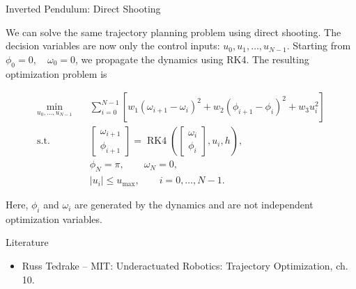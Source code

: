 \documentclass{beamer}
\begin{document}
\begin{frame}{Inverted Pendulum: Direct Shooting}
	\begin{flushleft}
		We can solve the same trajectory planning problem using
		direct shooting. The decision variables are now only the control inputs: $		u_0,u_1,\ldots,u_{N-1}$. Starting from $		\phi_0=0,
		\quad
		\omega_0=0$, 
		we propagate the dynamics using RK4. The resulting optimization problem is

		\begin{align}
			\min_{u_0,\ldots,u_{N-1}}\quad
			&
			\sum_{i=0}^{N-1}
			\left[
			w_1(\omega_{i+1}-\omega_i)^2
			+
			w_2(\phi_{i+1}-\phi_i)^2
			+
			w_3u_i^2
			\right]
			\\[0.5em]
			\text{s.t.}\quad
			&
			\begin{bmatrix}
				\omega_{i+1}\\
				\phi_{i+1}
			\end{bmatrix}
			=
			\operatorname{RK4}
			\left(
			\begin{bmatrix}
			\omega_i\\
			\phi_i
		\end{bmatrix},
		u_i,h
		\right),
		\\
		&
		\phi_N=\pi,\qquad
		\omega_N=0,
		\\
		&
		|u_i|\leq u_{\max},
		\qquad i=0,\ldots,N-1.
	\end{align}

	
	Here, $\phi_i$ and $\omega_i$ are generated by the
	dynamics and are not independent optimization variables.
\end{flushleft}
\end{frame}



\begin{frame}{Literature}
	
	\begin{itemize}
		
		
		\item Russ Tedrake -- MIT:
		{Underactuated Robotics: Trajectory Optimization, ch. 10.}
		
	\end{itemize}
	
\end{frame}



\myqrframe
\end{document}
